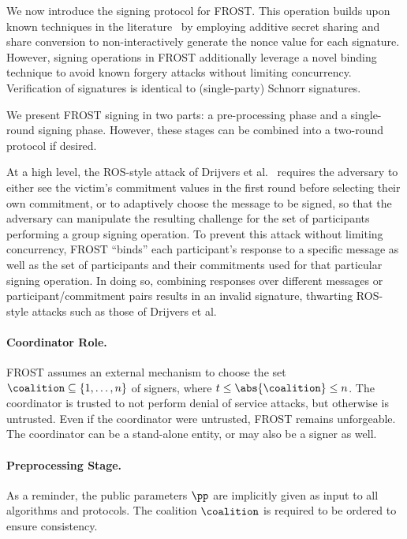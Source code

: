 We now introduce the signing protocol for FROST. This operation builds upon
known techniques in the literature~\cite{AbidinAM20,SchroderU17} by employing additive secret sharing and share
conversion to non-interactively generate the nonce value for each
signature.
However, signing operations in FROST additionally leverage a novel binding
technique to avoid known forgery attacks without limiting concurrency.
Verification of signatures is identical to (single-party) Schnorr signatures.

We present FROST signing in two parts: a pre-processing phase and a
single-round signing phase. However, these stages can be combined into a two-round protocol if desired.

At a high level,
the ROS-style attack of Drijvers et al.~\cite{DrijversEFKLNS19} requires the adversary to either
see the victim's commitment values in the first round before selecting their own commitment,
or to adaptively choose the message to
be signed, so that the adversary can manipulate the resulting challenge
for the set of participants performing a group signing operation.
To prevent this attack without limiting concurrency,
FROST ``binds'' each participant's response to a specific
message as well as the set of participants and their commitments used for that
particular signing operation. In doing so, combining responses
over different messages or participant/commitment pairs results in an invalid
signature, thwarting ROS-style attacks such as those of Drijvers et al.

\paragraph{Coordinator Role.}
FROST assumes an external mechanism to choose the set
$\coalition \subseteq \{1, \ldots, n \}$ of signers, where $t \leq \abs{\coalition} \leq n$.
The coordinator is trusted to not perform denial of service attacks,
but otherwise is untrusted.
Even if the coordinator were untrusted,
FROST remains unforgeable.
The coordinator can be a stand-alone entity,
or may also be a signer as well.


\paragraph{Preprocessing Stage.}
As a reminder, the public parameters $\pp$ are implicitly given as input to all algorithms and protocols.
The coalition $\coalition$ is required to be ordered to ensure consistency.

